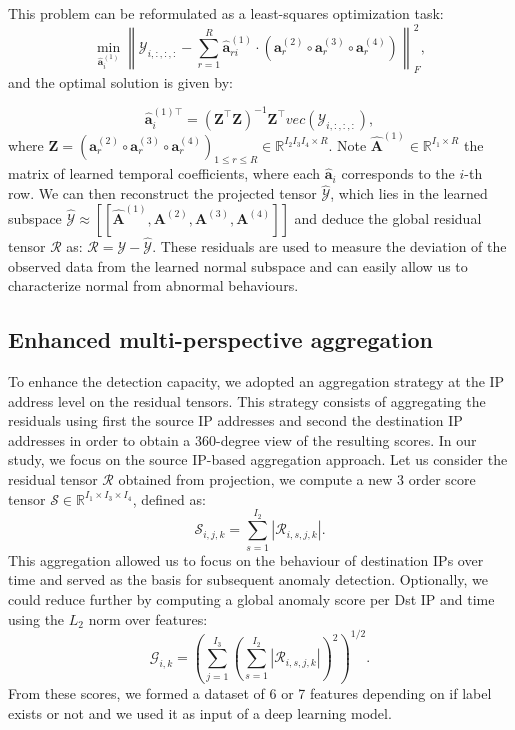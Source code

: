 \documentclass{ieeeaccess}
\begin{document}
\noindent This problem can be reformulated as a least-squares optimization task:
\begin{equation}
\min_{\hat{\mathbf{a}}_{i}^{(1)}} \left\| \mathcal{Y}_{i,:,:,:} - \sum_{r=1}^{R} \hat{\mathbf{a}}_{ri}^{(1)} \cdot \left( \mathbf{a}_r^{(2)} \circ \mathbf{a}_r^{(3)} \circ \mathbf{a}_r^{(4)} \right)\right\|_F^2,
\end{equation} and the optimal solution is given by: 

\begin{equation}
\hat{\mathbf{a}}_{i}^{{(1)}\top} = \left(\mathbf{Z}^\top \mathbf{Z} \right)^{-1} \mathbf{Z}^\top vec(\mathcal{Y}_{i,:,:,:}),
\end{equation}
where \(\mathbf{Z}=\left( \mathbf{a}_r^{(2)} \circ \mathbf{a}_r^{(3)} \circ \mathbf{a}_r^{(4)} \right)_{1\leq r\leq R} \in \mathbb{R}^{I_2I_3I_4 \times R}\).
Note \(\mathbf{\hat{A}}^{(1)} \in \mathbb{R}^{I_1 \times R}\)  the matrix of learned temporal coefficients, where each  \(\hat{\mathbf{a}}_i\) corresponds to the $i$-th row. We can then reconstruct the projected tensor \(\mathcal{\hat{Y}}\), which lies in the learned subspace \(
\mathcal{\hat{Y}} \approx [\![\mathbf{\hat{A}}^{(1)}, \mathbf{A}^{(2)}, \mathbf{A}^{(3)}, \mathbf{A}^{(4)}]\!]
\) and deduce the global residual tensor $\mathcal{R}$ as:
\(\mathcal{R} = \mathcal{Y} - \mathcal{\hat{Y}}.\)
These residuals are used to measure the deviation of the observed data from the learned normal subspace and can easily allow us to characterize normal from abnormal behaviours.

\subsection{Enhanced multi-perspective aggregation}

To enhance the detection capacity, we adopted an aggregation strategy at the IP address level on the residual tensors. This strategy consists of aggregating the residuals using first the source IP addresses and second the destination IP addresses in order to obtain a 360-degree view of the resulting scores. In our study, we focus on the source IP-based aggregation approach. Let us consider the residual tensor \(\mathcal{R}\) obtained from projection, we compute a new 3 order score tensor \(\mathcal{S} \in \mathbb{R}^{I_1 \times I_3 \times I_4}\), defined as:
\begin{equation}
    \mathcal{S}_{i, j, k} = \sum_{s=1}^{I_2} |\mathcal{R}_{i, s, j, k}|.
\end{equation}
\noindent This aggregation allowed us to focus on the behaviour of destination IPs over time and served as the basis for subsequent anomaly detection. Optionally, we could reduce further by computing a global anomaly score per Dst IP and time using the \(L_2\) norm over features:
\[
\mathcal{G}_{i,k} = \left( \sum_{j=1}^{I_3} \left( \sum_{s=1}^{I_2} |\mathcal{R}_{i, s, j, k}| \right)^2 \right)^{1/2}.
\]
\noindent From these scores, we formed a dataset of 6 or 7 features depending on if label exists or not and we used it as input of a deep learning model.
\end{document}
